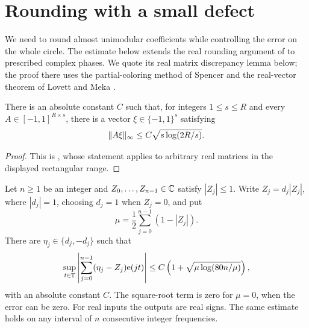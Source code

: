 \section{Rounding with a small defect}\label{sec:rounding}

We need to round almost unimodular coefficients while controlling the
error on the whole circle.  The estimate below extends the real rounding
argument of \cite[Section~6]{OpenAILowerEnvelope2026} to prescribed complex
phases.  We quote its real matrix discrepancy lemma below; the proof
there uses the partial-coloring method of Spencer \cite{Spencer1985}
and the real-vector theorem of Lovett and Meka
\cite[Theorem~4 of arXiv:1203.5747v2]{LovettMeka2015}.

\begin{lemma}\label{lem:matrix-discrepancy}
There is an absolute constant $C$ such that, for integers $1\le s\le R$
and every $A\in[-1,1]^{R\times s}$, there is a vector
$\xi\in\{-1,1\}^s$ satisfying
\[
 \lVert A\xi\rVert_\infty\le C\sqrt{s\log(2R/s)}.
\]
\end{lemma}

\begin{proof}
This is \cite[Lemma~6.2]{OpenAILowerEnvelope2026}, whose statement applies
to arbitrary real matrices in the displayed rectangular range.
\end{proof}

\begin{lemma}\label{lem:complex-rounding}
Let $n\ge1$ be an integer and $Z_0,\ldots,Z_{n-1}\in\mathbb C$ satisfy
$|Z_j|\le1$.  Write $Z_j=d_j|Z_j|$, where $|d_j|=1$, choosing $d_j=1$
when $Z_j=0$, and put
\[
 \mu=\frac12\sum_{j=0}^{n-1}(1-|Z_j|).
\]
There are $\eta_j\in\{d_j,-d_j\}$ such that
\begin{equation}\label{eq:complex-rounding}
 \sup_{t\in\mathbb T}\left|\sum_{j=0}^{n-1}(\eta_j-Z_j)\mathrm e(jt)\right|
 \le C\left(1+\sqrt{\mu\log(80n/\mu)}\right),
\end{equation}
with an absolute constant $C$.  The square-root term is zero for
$\mu=0$, when the error can be zero.  For real inputs the outputs are
real signs.  The same estimate holds on any interval of $n$ consecutive
integer frequencies.
\end{lemma}

